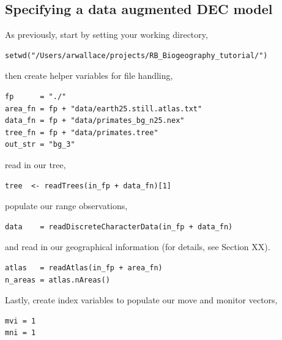 \subsection{Specifying a data augmented DEC model}

As previously, start by setting your working directory,

\begin{snugshade}
\begin{lstlisting}
setwd("/Users/arwallace/projects/RB_Biogeography_tutorial/")
\end{lstlisting}
\end{snugshade}

then create helper variables for file handling,

\begin{snugshade}
\begin{lstlisting}
fp      = "./"
area_fn = fp + "data/earth25.still.atlas.txt"
data_fn = fp + "data/primates_bg_n25.nex"
tree_fn = fp + "data/primates.tree"
out_str = "bg_3"
\end{lstlisting}
\end{snugshade}

read in our tree,

\begin{snugshade}
\begin{lstlisting}
tree  <- readTrees(in_fp + data_fn)[1]
\end{lstlisting}
\end{snugshade}

populate our range observations,

\begin{snugshade}
\begin{lstlisting}
data    = readDiscreteCharacterData(in_fp + data_fn)
\end{lstlisting}
\end{snugshade}

and read in our geographical information (for details, see Section XX).

\begin{snugshade}
\begin{lstlisting}
atlas   = readAtlas(in_fp + area_fn)
n_areas = atlas.nAreas()
\end{lstlisting}
\end{snugshade}

Lastly, create index variables to populate our move and monitor vectors,

\begin{snugshade}
\begin{lstlisting}
mvi = 1
mni = 1
\end{lstlisting}
\end{snugshade}

